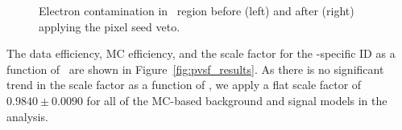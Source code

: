 \begin{figure}[htbp]
  \centering
  \caption{
    Electron contamination in \gj\ region before (left) and after (right) applying the pixel seed veto.
  }
  \label{fig:pvsf_contam}
\end{figure}
 
The data efficiency, MC efficiency, and the scale factor for the \Pgg-specific ID as a function of \pt\ are shown in Figure~\ref{fig:pvsf_results}. 
As there is no significant trend in the scale factor as a function of \pt, we apply a flat scale factor of $0.9840 \pm 0.0090$ for all of the MC-based background and signal models in the analysis.

